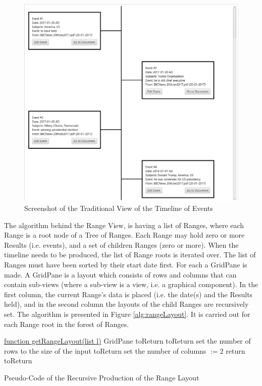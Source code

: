 \begin{figure}[H]
\caption{Screenshot of the Traditional View of the Timeline of Events}
\label{fig:traditionalView}
\includegraphics[width=\linewidth]{traditionalView.png}
\centering
\end{figure}

\par The algorithm behind the Range View, is having a list of Ranges, where each Range is a root node of a Tree of Ranges. Each Range may hold zero or more Results (i.e. events), and a set of children Ranges (zero or more). When the timeline needs to be produced, the list of Range roots is iterated over. The list of Ranges must have been sorted by their start date first. For each a GridPane is made. A GridPane is a layout which consists of rows and columns that can contain sub-views (where a sub-view is a view, i.e. a graphical component). In the first column, the current Range's data is placed (i.e. the date(s) and the Results held), and in the second column the layouts of the child Ranges are recursively set. The algorithm is presented in Figure \ref{alg:rangeLayout}. It is carried out for each Range root in the forest of Ranges.

\begin{algorithm}[H]
\underline{function getRangeLayout(list l)}\;
GridPane toReturn\;
toReturn set the number of rows to the size of the input\;
toReturn set the number of columns $:= 2$\;
return toReturn\;
\caption{Pseudo-Code of the Recursive Production of the Range Layout}
\label{alg:rangeLayout}
\end{algorithm}


